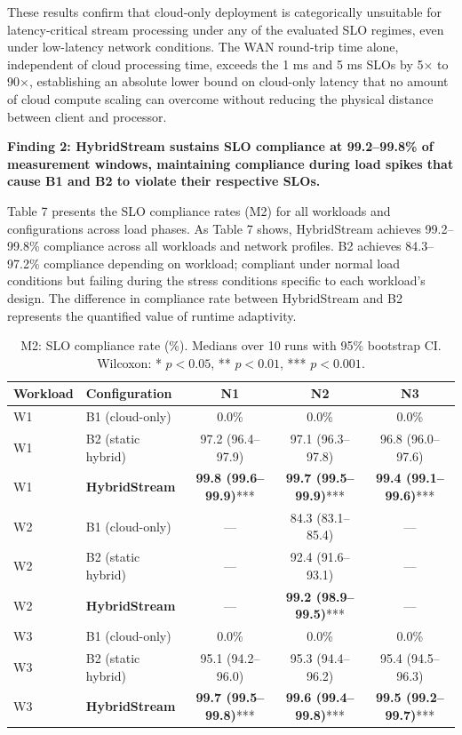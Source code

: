 \documentclass[preprint,review,12pt]{elsarticle}
\begin{document}
These results confirm that cloud-only deployment is categorically unsuitable for latency-critical stream processing under any of the evaluated SLO regimes, even under low-latency network conditions. The WAN round-trip time alone, independent of cloud processing time, exceeds the 1 ms and 5 ms SLOs by 5$\times$ to 90$\times$, establishing an absolute lower bound on cloud-only latency that no amount of cloud compute scaling can overcome without reducing the physical distance between client and processor.

\textbf{Finding 2: HybridStream sustains SLO compliance at 99.2--99.8\% of measurement windows, maintaining compliance during load spikes that cause B1 and B2 to violate their respective SLOs.}

Table 7 presents the SLO compliance rates (M2) for all workloads and configurations across load phases. As Table 7 shows, HybridStream achieves 99.2--99.8\% compliance across all workloads and network profiles. B2 achieves 84.3--97.2\% compliance depending on workload; compliant under normal load conditions but failing during the stress conditions specific to each workload's design. The difference in compliance rate between HybridStream and B2 represents the quantified value of runtime adaptivity.


\begin{table}[htbp]
\centering
\caption{M2: SLO compliance rate (\%). Medians over 10 runs with 95\% bootstrap CI. Wilcoxon: * $p < 0.05$, ** $p < 0.01$, *** $p < 0.001$.}
\label{tab:slo}
\begin{tabular}{@{}llccc@{}}
\toprule
Workload & Configuration & N1 & N2 & N3 \\
\midrule
W1 & B1 (cloud-only) & 0.0\% & 0.0\% & 0.0\% \\
W1 & B2 (static hybrid) & 97.2 (96.4--97.9) & 97.1 (96.3--97.8) & 96.8 (96.0--97.6) \\
W1 & \textbf{HybridStream} & \textbf{99.8 (99.6--99.9)}*** & \textbf{99.7 (99.5--99.9)}*** & \textbf{99.4 (99.1--99.6)}*** \\
\midrule
W2 & B1 (cloud-only) & --- & 84.3 (83.1--85.4) & --- \\
W2 & B2 (static hybrid) & --- & 92.4 (91.6--93.1) & --- \\
W2 & \textbf{HybridStream} & --- & \textbf{99.2 (98.9--99.5)}*** & --- \\
\midrule
W3 & B1 (cloud-only) & 0.0\% & 0.0\% & 0.0\% \\
W3 & B2 (static hybrid) & 95.1 (94.2--96.0) & 95.3 (94.4--96.2) & 95.4 (94.5--96.3) \\
W3 & \textbf{HybridStream} & \textbf{99.7 (99.5--99.8)}*** & \textbf{99.6 (99.4--99.8)}*** & \textbf{99.5 (99.2--99.7)}*** \\
\bottomrule
\end{tabular}
\end{table}
\end{document}
